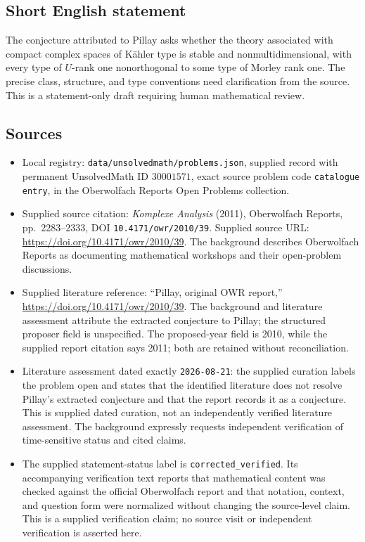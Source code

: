 \documentclass[11pt]{article}
\begin{document}
\subsection{Short English statement}
The conjecture attributed to Pillay asks whether the theory associated with compact complex spaces of K\"ahler type is stable and nonmultidimensional, with every type of \(U\)-rank one nonorthogonal to some type of Morley rank one. The precise class, structure, and type conventions need clarification from the source. This is a statement-only draft requiring human mathematical review.
\subsection{Sources}
\begin{itemize}
\item Local registry: \texttt{data/unsolvedmath/problems.json}, supplied record with permanent UnsolvedMath ID \(30001571\), exact source problem code \texttt{catalogue entry}, in the Oberwolfach Reports Open Problems collection.
\item Supplied source citation: \emph{Komplexe Analysis} (2011), Oberwolfach Reports, pp.\ 2283--2333, DOI \texttt{10.4171/owr/2010/39}. Supplied source URL: \url{https://doi.org/10.4171/owr/2010/39}. The background describes Oberwolfach Reports as documenting mathematical workshops and their open-problem discussions.
\item Supplied literature reference: ``Pillay, original OWR report,'' \url{https://doi.org/10.4171/owr/2010/39}. The background and literature assessment attribute the extracted conjecture to Pillay; the structured proposer field is unspecified. The proposed-year field is 2010, while the supplied report citation says 2011; both are retained without reconciliation.
\item Literature assessment dated exactly \texttt{2026-08-21}: the supplied curation labels the problem open and states that the identified literature does not resolve Pillay's extracted conjecture and that the report records it as a conjecture. This is supplied dated curation, not an independently verified literature assessment. The background expressly requests independent verification of time-sensitive status and cited claims.
\item The supplied statement-status label is \texttt{corrected\_verified}. Its accompanying verification text reports that mathematical content was checked against the official Oberwolfach report and that notation, context, and question form were normalized without changing the source-level claim. This is a supplied verification claim; no source visit or independent verification is asserted here.
\end{itemize}
\end{document}
